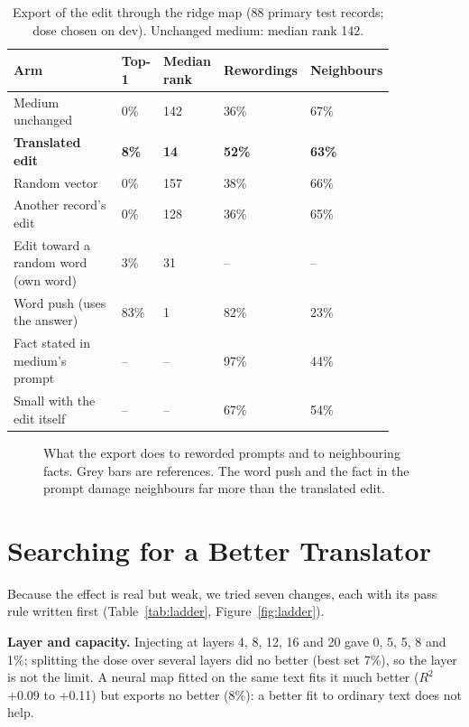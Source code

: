 \begin{table}[t]
\centering\small
\caption{Export of the edit through the ridge map (88 primary test records; dose chosen on dev). Unchanged medium: median rank 142.}\label{tab:export}
\begin{tabular}{|p{0.38\linewidth}|p{0.10\linewidth}|p{0.12\linewidth}|p{0.12\linewidth}|p{0.12\linewidth}|}
\hline
\textbf{Arm} & \textbf{Top-1} & \textbf{Median rank} & \textbf{Rewordings} & \textbf{Neighbours}\\ \hline
Medium unchanged & 0\% & 142 & 36\% & 67\%\\ \hline
\textbf{Translated edit} & \textbf{8\%} & \textbf{14} & \textbf{52\%} & \textbf{63\%}\\ \hline
Random vector & 0\% & 157 & 38\% & 66\%\\ \hline
Another record's edit & 0\% & 128 & 36\% & 65\%\\ \hline
Edit toward a random word (own word) & 3\% & 31 & -- & --\\ \hline
Word push (uses the answer) & 83\% & 1 & 82\% & 23\%\\ \hline
Fact stated in medium's prompt & -- & -- & 97\% & 44\%\\ \hline
Small with the edit itself & -- & -- & 67\% & 54\%\\ \hline
\end{tabular}
\end{table}

\begin{figure}[t]
\centering
{}
\caption{What the export does to reworded prompts and to neighbouring facts. Grey bars are references. The word push and the fact in the prompt damage neighbours far more than the translated edit.}\label{fig:side}
\end{figure}

\section{Searching for a Better Translator}\label{sec:search}

Because the effect is real but weak, we tried seven changes, each with its pass rule written first (Table~\ref{tab:ladder}, Figure~\ref{fig:ladder}).

\textbf{Layer and capacity.} Injecting at layers 4, 8, 12, 16 and 20 gave 0, 5, 5, 8 and 1\%; splitting the dose over several layers did no better (best set 7\%), so the layer is not the limit. A neural map fitted on the same text fits it much better ($R^2$ +0.09 to +0.11) but exports no better (8\%): a better fit to ordinary text does not help.

